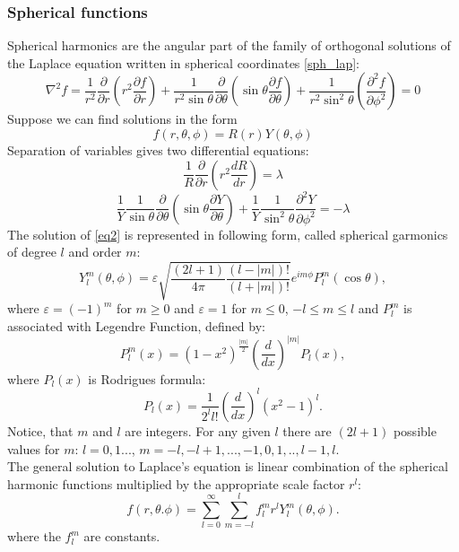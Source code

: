 \documentclass[a4paper, 12pt]{article}
\begin{document}
\subsubsection{Spherical functions}
Spherical harmonics are the angular part of the family of orthogonal solutions of the Laplace equation written in spherical coordinates \eqref{sph_lap}:
$$\nabla^2 {f} = \frac{1}{r^2} \frac{\partial}{\partial r}({r^2}\frac{\partial f}{\partial r})+\frac{1}{r^2\sin{\theta}}\frac{\partial}{\partial \theta}(\sin{\theta}\frac{\partial f}{\partial \theta})+\frac{1}{r^2\sin^2{\theta}}(\frac{\partial^2 f}{\partial \phi^2}) = 0$$
Suppose we can find solutions in the form $$f({r}, \theta, \phi) = R(r)Y(\theta, \phi)$$
Separation of variables gives two differential equations:
$$\frac{1}{R}\frac{\partial}{\partial r}(r^2 \frac {dR}{dr}) = \lambda$$
\begin{equation}\label{eq2}
	\frac{1}{Y}\frac{1}{\sin{\theta}}\frac{\partial}{\partial \theta}(\sin{\theta}\frac{\partial Y}{\partial \theta})+\frac{1}{Y}\frac{1}{\sin^2{\theta}}\frac{\partial^2 Y}{\partial \phi^2} = -\lambda
\end{equation}
The solution of \eqref{eq2} is represented in following form, called spherical garmonics of degree $l$ and order $m$:
\begin{equation}\label{sph_garm}
	Y_l^m(\theta, \phi)=\varepsilon \sqrt{\frac{(2l+1)}{4\pi}\frac{(l-|m|)!}{(l+|m|)!}}e^{im\phi}P_l^m(\cos{\theta}),
\end{equation}
 where $\varepsilon = (-1)^m$ for $m\geq0$ and $\varepsilon=1$ for $m \leq 0$, $-l \leq m \leq l$ and $P_l^m $ is associated with Legendre Function, defined by:
	$$P_l^m(x)=(1-x^2)^{\frac{|m|}{2}}(\frac{d}{dx})^{|m|}P_l(x),$$
where $P_l(x) $ is Rodrigues formula:
	$$P_l(x) = \frac{1}{2^l l!}(\frac{d}{dx})^l (x^2-1)^l.$$
Notice, that $m$ and $l$ are integers. For any given $l$ there are $(2l+1)$ possible values for $m$: $l=0, 1...$, $m = -l, -l+1,..., -1, 0, 1, .., l-1, l.$\\
The general solution to Laplace's equation is linear combination of the spherical harmonic functions multiplied by the appropriate scale factor $r^l$:
	$$f(r, \theta. \phi) = \sum_{l=0} ^{\infty}\sum_{m=-l} ^{l}f_l^mr^l Y_l^m(\theta, \phi).$$
where the $f_l^m$ are constants.
\end{document}
